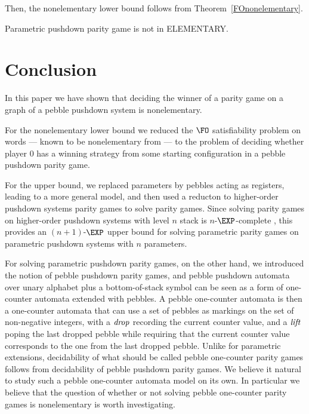 \documentclass[a4paper,UKenglish,cleveref, autoref, thm-restate]{lipics-v2021}
\begin{document}
Then, the nonelementary lower bound follows from Theorem~\ref{FOnonelementary}. 



\begin{theorem}
{\sc Parametric pushdown parity game} is not in {\sc ELEMENTARY}.
\end{theorem}





\section{Conclusion}

In this paper we have shown that
deciding
the winner of a parity game on a graph of a pebble pushdown system 
is nonelementary.

	For the nonelementary lower bound
we reduced the $\FO$ satisfiability problem on words \---- known to be nonelementary
from \cite{Sto74} \---- to the
problem of deciding whether player $0$ has a winning strategy from some starting configuration in 
a pebble pushdown parity game.

	For the upper bound, we replaced parameters by pebbles acting as registers, leading to a more general model, and then used a reducton to higher-order pushdown systems parity games to solve parity games. Since solving parity games on higher-order pushdown systems with level $n$ stack is $n$-$\EXP$-complete \cite{ Cach03, cachat2007complexity}, this provides an $(n+1)$-$\EXP$ upper bound for solving parametric parity games on parametric pushdown systems with $n$ parameters.


For solving parametric pushdown parity games, on the other hand, we introduced the notion of pebble pushdown parity games, and
pebble pushdown automata over unary alphabet plus a bottom-of-stack symbol
can be seen as a form of one-counter automata extended with pebbles. 
A pebble one-counter automata is then a one-counter automata that
can use a set of pebbles as markings on the set of non-negative integers, with a 
$\text{\textit{drop}}$ recording the current counter value, and a 
$\text{\textit{lift}}$ poping the last dropped
pebble while requiring that the current counter value 
corresponds to the one from the last dropped pebble.
%
Unlike for parametric extensions, 
decidability of 
what should be called
pebble one-counter parity games follows from
decidability of pebble pushdown parity games. 
We believe it natural to study such a pebble one-counter automata model
on its own.
In particular we believe that the question of whether or not
solving pebble one-counter parity games is nonelementary is worth investigating.
\end{document}
